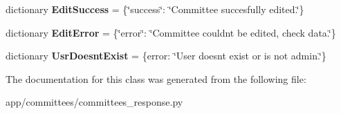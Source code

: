 \begin{DoxyCompactItemize}
dictionary {\bfseries Edit\+Success} = \{\char`\"{}success\char`\"{}\+: \char`\"{}Committee succesfully edited.\char`\"{}\}
\item 
\mbox{\label{classapp_1_1committees_1_1committees__response_1_1_response_ab1ea7c79830d290a54fde82cadb42f37}} 
dictionary {\bfseries Edit\+Error} = \{\char`\"{}error\char`\"{}\+: \char`\"{}Committee couldn\textquotesingle{}t be edited, check data.\char`\"{}\}
\item 
\mbox{\label{classapp_1_1committees_1_1committees__response_1_1_response_a66fc92b85a95a996af0a405d063f0bf4}} 
dictionary {\bfseries Usr\+Doesnt\+Exist} = \{\textquotesingle{}error\textquotesingle{}\+: \char`\"{}User doesn\textquotesingle{}t exist or is not admin.\char`\"{}\}
\end{DoxyCompactItemize}


The documentation for this class was generated from the following file\+:\begin{DoxyCompactItemize}
\item 
app/committees/committees\+\_\+response.\+py\end{DoxyCompactItemize}
